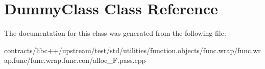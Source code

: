 \hypertarget{class_dummy_class}{}\section{Dummy\+Class Class Reference}
\label{class_dummy_class}


The documentation for this class was generated from the following file\+:\begin{DoxyCompactItemize}
\item 
contracts/libc++/upstream/test/std/utilities/function.\+objects/func.\+wrap/func.\+wrap.\+func/func.\+wrap.\+func.\+con/alloc\+\_\+\+F.\+pass.\+cpp\end{DoxyCompactItemize}
